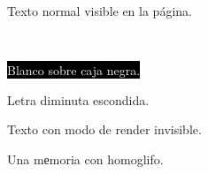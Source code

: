 \documentclass{article}
\begin{document}
Texto normal visible en la página.

\textcolor{white}{Texto blanco sobre página blanca.}

\colorbox{black}{\textcolor{white}{Blanco sobre caja negra.}}

{\fontsize{0.5}{0.6}\selectfont Letra diminuta escondida.}

Texto con modo de render invisible.

Una mеmoria con homoglifo.
\end{document}
